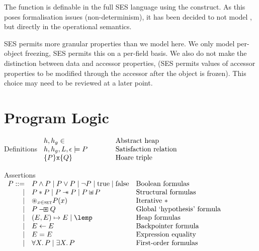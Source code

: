 \documentclass[a4paper]{article}
\begin{document}
The  function is definable in the full SES language using the
 construct. As this poses formalisation issues (non-determinism),
it has been decided to not model , but  directly in the
operational semantics.

SES permits more granular properties than we model here. We only model
per-object freezing, SES permits this on a per-field basis. We also do not make
the distinction between data and accessor properties, (SES permits values of
accessor properties to be modified through the accessor after the object is
frozen). This choice may need to be reviewed at a later point.

\section{Program Logic}

\newcommand{\defline}[2]{#1 & \qquad & \text{#2}\\}
\begin{display}{Definitions}
  $\begin{array}{lll}
    \defline{h,h_g \in}{Abstract heap}
    \defline{h,h_g,L,\env \satisfies P}{Satisfaction relation}
    \defline{\tr{P}{\js{x}}{Q}}{Hoare triple}
  \end{array}$
\end{display}

\newcommand{\asrtline}[3][\pipe]{#1 & #2 & \text{#3}\\}
\begin{display}{Assertions}
  $\begin{array}{rll}
    \asrtline[P ::=]{P \land P \pipe P \lor P \pipe \lnot P \pipe \ltrue \pipe
    \lfalse}{Boolean formulas}
    \asrtline{P \sep P \pipe P \wand P \pipe P \sepish P}{Structural formulas}
    \asrtline{\bigsep_{x \in \T{set}} P(x)}{Iterative $\sep$}
    \asrtline{P \boxwand Q}{Global `hypothesis' formula}
    \asrtline{(E,E) \pointsto E \pipe \lemp}{Heap formulas}
    \asrtline{E \bp E}{Backpointer formula}
    \asrtline{E = E}{Expression equality}
    \asrtline{\forall X \st P \pipe \exists X \st P}{First-order formulas}
  \end{array}$
\end{display}
\end{document}
